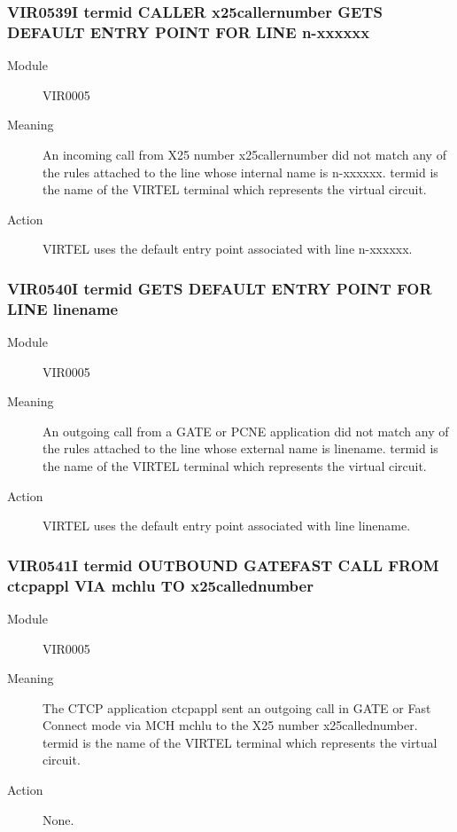 \documentclass[letterpaper,10pt,english]{sphinxmanual}
\begin{document}
\subsubsection{VIR0539I termid CALLER x25callernumber GETS DEFAULT ENTRY POINT FOR LINE n-xxxxxx}
\label{\detokenize{messages:vir0539i-termid-caller-x25callernumber-gets-default-entry-point-for-line-n-xxxxxx}}\begin{description}
\item[{Module}] \leavevmode
VIR0005

\item[{Meaning}] \leavevmode
An incoming call from X25 number x25callernumber did not match any of the rules attached to the line whose internal name is n-xxxxxx. termid is the name of the VIRTEL terminal which represents the virtual circuit.

\item[{Action}] \leavevmode
VIRTEL uses the default entry point associated with line n-xxxxxx.

\end{description}


\subsubsection{VIR0540I termid GETS DEFAULT ENTRY POINT FOR LINE linename}
\label{\detokenize{messages:vir0540i-termid-gets-default-entry-point-for-line-linename}}\begin{description}
\item[{Module}] \leavevmode
VIR0005

\item[{Meaning}] \leavevmode
An outgoing call from a GATE or PCNE application did not match any of the rules attached to the line whose external name is linename. termid is the name of the VIRTEL terminal which represents the virtual circuit.

\item[{Action}] \leavevmode
VIRTEL uses the default entry point associated with line linename.

\end{description}


\subsubsection{VIR0541I termid OUTBOUND GATE\textbar{}FAST CALL FROM ctcpappl VIA mchlu TO x25callednumber}
\label{\detokenize{messages:vir0541i-termid-outbound-gate-fast-call-from-ctcpappl-via-mchlu-to-x25callednumber}}\begin{description}
\item[{Module}] \leavevmode
VIR0005

\item[{Meaning}] \leavevmode
The CTCP application ctcpappl sent an outgoing call in GATE or Fast Connect mode via MCH mchlu to the X25 number x25callednumber. termid is the name of the VIRTEL terminal which represents the virtual circuit.

\item[{Action}] \leavevmode
None.

\end{description}
\end{document}
